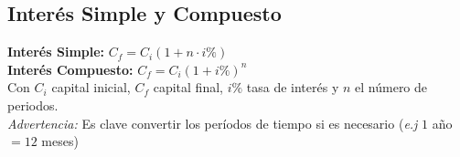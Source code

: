 \subsection{Interés Simple y Compuesto}
\textbf{Interés Simple:} $C_f = C_i(1+n\cdot i\%)$\\
\textbf{Interés Compuesto:} $C_f = C_i (1 + i \%)^n$\\

Con $C_i$ capital inicial, $C_f$ capital final, $i\%$ tasa de interés y $n$ el número de periodos.\\

\textit{Advertencia:} Es clave convertir los períodos de tiempo si es necesario (\textit{e.j} $1$ año $= 12$ meses)\\